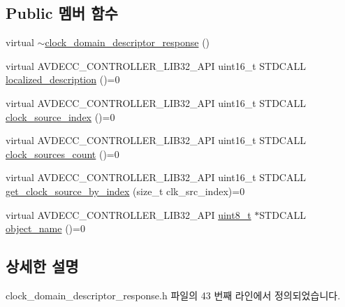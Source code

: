 \subsection*{Public 멤버 함수}
\begin{DoxyCompactItemize}
\item 
virtual \hyperlink{classavdecc__lib_1_1clock__domain__descriptor__response_a2dfbcfc6c52de520f3120d263d9274c3}{$\sim$clock\+\_\+domain\+\_\+descriptor\+\_\+response} ()
\item 
virtual A\+V\+D\+E\+C\+C\+\_\+\+C\+O\+N\+T\+R\+O\+L\+L\+E\+R\+\_\+\+L\+I\+B32\+\_\+\+A\+PI uint16\+\_\+t S\+T\+D\+C\+A\+LL \hyperlink{classavdecc__lib_1_1clock__domain__descriptor__response_a1fb9de45567df344090a1407aa6b775f}{localized\+\_\+description} ()=0
\item 
virtual A\+V\+D\+E\+C\+C\+\_\+\+C\+O\+N\+T\+R\+O\+L\+L\+E\+R\+\_\+\+L\+I\+B32\+\_\+\+A\+PI uint16\+\_\+t S\+T\+D\+C\+A\+LL \hyperlink{classavdecc__lib_1_1clock__domain__descriptor__response_ad8ab5475f732fd4a64d51d9a2010ade5}{clock\+\_\+source\+\_\+index} ()=0
\item 
virtual A\+V\+D\+E\+C\+C\+\_\+\+C\+O\+N\+T\+R\+O\+L\+L\+E\+R\+\_\+\+L\+I\+B32\+\_\+\+A\+PI uint16\+\_\+t S\+T\+D\+C\+A\+LL \hyperlink{classavdecc__lib_1_1clock__domain__descriptor__response_aa0b491746924156b188aadca22d0938f}{clock\+\_\+sources\+\_\+count} ()=0
\item 
virtual A\+V\+D\+E\+C\+C\+\_\+\+C\+O\+N\+T\+R\+O\+L\+L\+E\+R\+\_\+\+L\+I\+B32\+\_\+\+A\+PI uint16\+\_\+t S\+T\+D\+C\+A\+LL \hyperlink{classavdecc__lib_1_1clock__domain__descriptor__response_a1ea52be8698ee7b8efd364de5b30a82f}{get\+\_\+clock\+\_\+source\+\_\+by\+\_\+index} (size\+\_\+t clk\+\_\+src\+\_\+index)=0
\item 
virtual A\+V\+D\+E\+C\+C\+\_\+\+C\+O\+N\+T\+R\+O\+L\+L\+E\+R\+\_\+\+L\+I\+B32\+\_\+\+A\+PI \hyperlink{stdint_8h_aba7bc1797add20fe3efdf37ced1182c5}{uint8\+\_\+t} $\ast$S\+T\+D\+C\+A\+LL \hyperlink{classavdecc__lib_1_1descriptor__response__base_a133f7774946d80f82b8aaaa4cfbb7361}{object\+\_\+name} ()=0
\end{DoxyCompactItemize}


\subsection{상세한 설명}


clock\+\_\+domain\+\_\+descriptor\+\_\+response.\+h 파일의 43 번째 라인에서 정의되었습니다.



